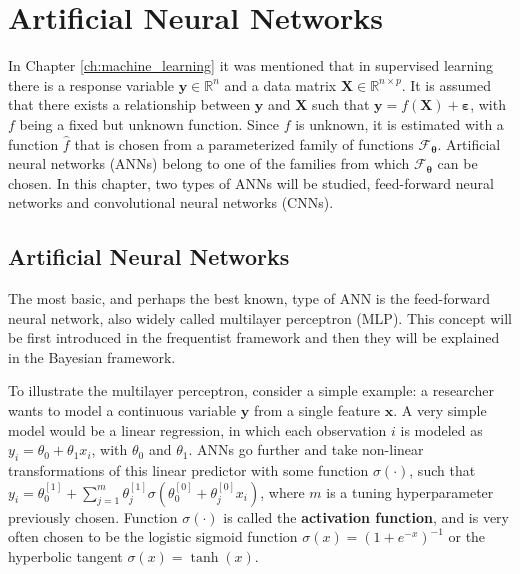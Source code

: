 
\chapter{Artificial Neural Networks}
\label{ch:ann}


In Chapter \ref{ch:machine_learning} it was mentioned that in supervised learning there is a response variable $\boldsymbol{y} \in \mathbb{R}^n$ and a data matrix $\boldsymbol{X} \in \mathbb{R}^{n \times p}$. It is assumed that there exists a relationship between $\boldsymbol{y}$ and $\boldsymbol{X}$ such that
$\boldsymbol{y} = f(\boldsymbol{X}) + \boldsymbol{\varepsilon}$,
with $f$ being a fixed but unknown function. Since $f$ is unknown, it is estimated with a function $\hat{f}$ that is chosen from a parameterized family of functions $\mathcal{F}_{\boldsymbol{\theta}}$. Artificial neural networks (ANNs) belong to one of the families from which $\mathcal{F}_{\boldsymbol{\theta}}$ can be chosen. In this chapter, two types of ANNs will be studied, feed-forward neural networks and convolutional neural networks (CNNs).

\section{Artificial Neural Networks}

The most basic, and perhaps the best known, type of ANN is the feed-forward neural network, also widely called multilayer perceptron (MLP). This concept will be first introduced in the frequentist framework and then they will be explained in the Bayesian framework.

To illustrate the multilayer perceptron, consider a simple example: a researcher wants to model a continuous variable $\boldsymbol{y}$ from a single feature $\boldsymbol{x}$. A very simple model would be a linear regression, in which each observation $i$ is modeled as $y_i = \theta_0 + \theta_1 x_i$, with $\theta_0$ and $\theta_1$. ANNs go further and take non-linear transformations of this linear predictor with some function $\sigma(\cdot)$,
such that $y_i = \theta_0^{[1]} +  \sum_{j = 1}^m \theta_j^{[1]} \sigma \left( \theta_0^{[0]} + \theta_j^{[0]} x_i \right)$,
where $m$ is a tuning hyperparameter previously chosen.
Function $\sigma(\cdot)$ is called the \textbf{activation function}, and is very often chosen to be the logistic sigmoid function $\sigma(x) = (1 + e^{-x})^{-1}$
or the hyperbolic tangent $\sigma(x) = \tanh(x)$.

